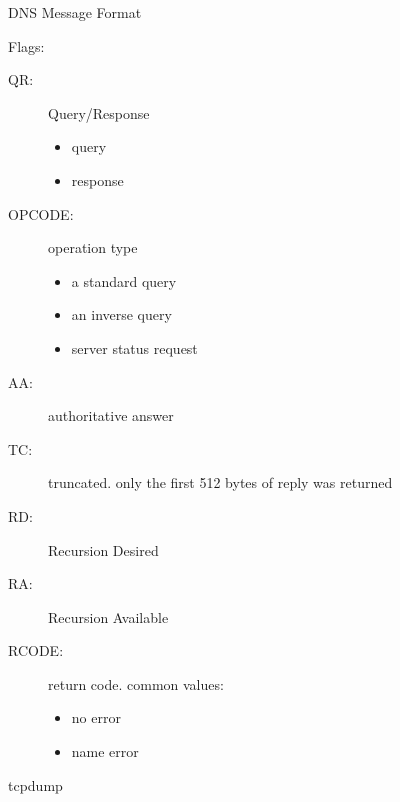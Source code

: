 \begin{frame}{DNS Message Format}
  \begin{center}
  \end{center}
  Flags:
  \begin{multicols}{2}{\scriptsize    
      \begin{description}
      \item[QR:] Query/Response
        \begin{itemize}
        \item[0:] {\scriptsize query}
        \item[1:] {\scriptsize response}
        \end{itemize}
      \item[OPCODE:] operation type
        \begin{itemize}
        \item[0] {\scriptsize a standard query}
        \item[1] {\scriptsize an inverse query}
        \item[2] {\scriptsize server status request}
        \end{itemize}
      \item[AA:] authoritative answer
      \item[TC:] truncated. only the first 512 bytes of reply was returned
      \item[RD:] Recursion Desired
      \item[RA:] Recursion Available
      \item[RCODE:] return code. common values:
        \begin{itemize}
        \item[0] {\scriptsize no error}
        \item[3] {\scriptsize name error}
        \end{itemize}
    \end{description}}
\end{multicols}
\end{frame}

\begin{frame}
  \begin{center}
  \end{center}
\end{frame}

\begin{frame}{tcpdump}
  \begin{center}
  \end{center}
\end{frame}


